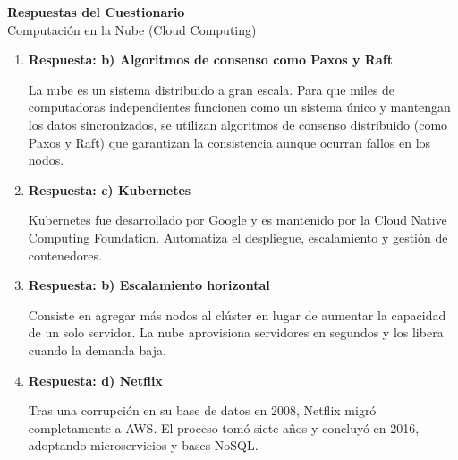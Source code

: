 \documentclass[12pt,letterpaper]{article}
\begin{document}
\newpage

\begin{center}
    {\Large\bfseries Respuestas del Cuestionario}\\[0.3cm]
    {\normalsize Computaci\'on en la Nube (Cloud Computing)}
\end{center}

\vspace{0.5cm}

\begin{enumerate}[label=\textbf{\arabic*.}, leftmargin=1.5em, itemsep=0.5cm]

    \item \textbf{Respuesta: b) Algoritmos de consenso como Paxos y Raft}

    La nube es un sistema distribuido a gran escala. Para que miles de computadoras independientes funcionen como un sistema único y mantengan los datos sincronizados, se utilizan algoritmos de consenso distribuido (como Paxos y Raft) que garantizan la consistencia aunque ocurran fallos en los nodos.
    \item \textbf{Respuesta: c) Kubernetes}

    Kubernetes fue desarrollado por Google y es mantenido por la Cloud Native Computing Foundation. Automatiza el despliegue, escalamiento y gesti\'on de contenedores.

    \item \textbf{Respuesta: b) Escalamiento horizontal}

    Consiste en agregar m\'as nodos al cl\'uster en lugar de aumentar la capacidad de un solo servidor. La nube aprovisiona servidores en segundos y los libera cuando la demanda baja.

    \item \textbf{Respuesta: d) Netflix}

    Tras una corrupci\'on en su base de datos en 2008, Netflix migr\'o completamente a AWS. El proceso tom\'o siete a\~nos y concluy\'o en 2016, adoptando microservicios y bases NoSQL.

\end{enumerate}
\end{document}
